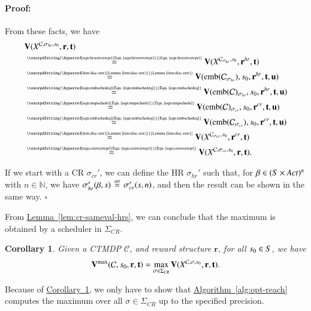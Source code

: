 \documentclass[10pt,twocolumn]{article}
\newenvironment{proof}{\paragraph{Proof:}}{\hfill$\square$}
\newtheorem{corollary}{Corollary}
\newcommand{\states} {{\ensuremath S}}
\newcommand{\state}  {{\ensuremath s}}
\newcommand{\nats}    {{\ensuremath {\mathbb{N}}}}
\newcommand{\sched}  {{\ensuremath {\sigma}}}
\newcommand{\acts}{\mathit{Act}}
\newcommand{\cmodel}{\mathcal{C}}
\newcommand{\mpath}{\beta}
\newcommand{\urate}{\mathbf{u}}
\newcommand{\schedscr}{\Sigma_\mathit{CR}}
\newcommand{\schedhr}{{\sigma_\mathit{hr}}}
\newcommand{\schedcr}{{\sigma_\mathit{cr}}}
\newcommand{\rew}{\mathbf{r}}
\newcommand{\timeb}{\mathbf{t}}
\newcommand{\mvalue}{\mathbf{V}}
\newcommand{\emb}{\mathrm{emb}}
\newcommand{\stopro}{X}
\newcommand{\reflem}[1]{\texorpdfstring{\hyperref[lem:#1]{Lemma~\ref*{lem:#1}}}{Lemma~\ref*{lem:#1}}}
\newcommand{\refseqn}[1]{\texorpdfstring{\hyperref[eqn:#1]{Eqn.~\ref*{eqn:#1}}}{Eqn.~\ref*{eqn:#1}}}
\newcommand{\refalg}[1]{\texorpdfstring{\hyperref[alg:#1]{Algorithm~\ref*{alg:#1}}}{Algorithm~\ref*{alg:#1}}}
\newcommand{\refcor}[1]{\texorpdfstring{\hyperref[cor:#1]{Corollary~\ref*{cor:#1}}}{Corollary~\ref*{cor:#1}}}
\newcommand{\defeq}{\,\stackrel{\mbox{\rm {\tiny def}}}{=}\,}
\begin{document}
\begin{proof}
  From these facts, we have
\begin{equation}
    \begin{split}
      & \mvalue(\stopro^{\cmodel,\schedhr,\state_0}, \rew, \timeb) \\
      & \stackrel{\mbox{\tiny\refseqn{hrsrewrewpr}}}{=} \mvalue(\stopro^{\cmodel_{\schedhr},\state_0}, \rew^{\mathit{hr}}, \timeb) \\
      & \stackrel{\mbox{\tiny\reflem{disc-rew}}}{=}
      \mvalue(\emb(\cmodel_{\schedhr}), \state_0, \rew^{\mathit{hr}}, \timeb, \urate) \\
      & \stackrel{\mbox{\tiny\refseqn{embschedeq}}}{=} \mvalue(\emb(\cmodel)_{\schedhr}, \state_0, \rew^{\mathit{hr}}, \timeb, \urate) \\
      & \stackrel{\mbox{\tiny\refseqn{mapscheds}}}{=} \mvalue(\emb(\cmodel)_\schedcr, \state_0, \rew^{\mathit{cr}}, \timeb, \urate) \\
      & \stackrel{\mbox{\tiny\refseqn{embschedeq}}}{=} \mvalue(\emb(\cmodel_\schedcr), \state_0, \rew^{\mathit{cr}}, \timeb, \urate) \\
      & \stackrel{\mbox{\tiny\reflem{disc-rew}}}{=} \mvalue(\stopro^{\cmodel_\schedcr,\state_0}, \rew^{\mathit{cr}}, \timeb) \\
      & \stackrel{\mbox{\tiny\refseqn{crrewrewpr}}}{=} \mvalue(\stopro^{\cmodel,\schedcr,\state_0}, \rew, \timeb) .
    \end{split}
  \end{equation}

  If we start with a CR $\sigma_\mathit{cr}'$, we can define the HR $\sigma_\mathit{hr}'$ such that,
  for $\mpath \in (\states \times \acts)^n$ with $n \in \nats$, we have
  $\sigma_\mathit{hr}'(\mpath, \state) \defeq \sigma_\mathit{cr}'(\state, n)$,
  and then the result can be shown in the same way.
\end{proof}

From \reflem{cr-sameval-hrs}, we can conclude that the maximum is obtained by a scheduler in $\schedscr$.
\begin{corollary}
  \label{cor:cr-suffices-ct}
Given a CTMDP $\cmodel$, and reward structure $\rew$, for all $\state_0 \in \states$, we have
\[
  \mvalue^{\max}(\cmodel, \state_0, \rew, \timeb) = \max_{\sched \in \schedscr} \mvalue(\stopro^{\cmodel,\sched,\state_0},\rew, \timeb) .
  \]
\end{corollary}

Because of \refcor{cr-suffices-ct}, we only have to show that \refalg{opt-reach} computes the maximum over all $\sched \in \schedscr$ up to the specified precision.
\end{document}
